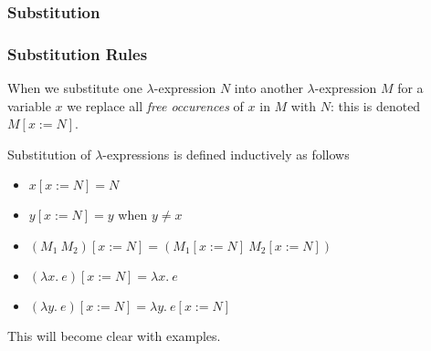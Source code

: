 \documentclass{beamer}
\begin{document}
\begin{frame}
	\frametitle{Substitution}


\end{frame}

\begin{frame}
	\frametitle{Substitution Rules}
	
	When we substitute one $\lambda$-expression $N$ into another $\lambda$-expression $M$ for a variable $x$ we replace all \emph{free occurences} of $x$ in $M$ with $N$: this is denoted $M[x:=N]$. 
	
	Substitution of $\lambda$-expressions is defined inductively as follows

	\begin{itemize}
		\item[] $x[x:=N] = N$ \vspace{0.2cm}
		\item[] $y[x:=N] = y$ when $y \neq x$ \vspace{0.2cm}
		\item[] $(M_{1} \ M_{2})[x:=N] = (M_{1}[x:=N] \ M_{2}[x:=N])$ \vspace{0.2cm}
		\item[] $(\lambda x. \ e)[x:=N] = \lambda x. \ e$ \vspace{0.2cm}
		\item[] $(\lambda y. \ e)[x:=N] = \lambda y. \ e[x:=N]$
	\end{itemize}

	This will become clear with examples.
	
\end{frame}
\end{document}
